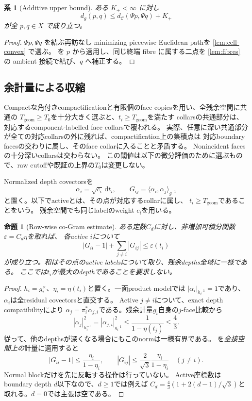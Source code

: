 \documentclass[11pt,a4paper]{ltjsarticle}
\newcommand{\dd}{\mathrm d}
\newcommand{\cC}{\mathcal C}
\theoremstyle{plain}
\newtheorem{proposition}[proposition]{命題}
\newtheorem{corollary}[corollary]{系}
\theoremstyle{definition}
\theoremstyle{remark}
\begin{document}
\begin{corollary}[Additive upper bound]
\label{cor:upper}
ある $K_+<\infty$ に対し
\[
 d_g(p,q)\le d_\cC(\Psi p,\Psi q)+K_+
\]
が全 $p,q\in X$ で成り立つ。
\end{corollary}
\begin{proof}
$\Psi p,\Psi q$ を結ぶ再訪なし minimizing piecewise Euclidean pathを \cref{lem:cell-convex} で選ぶ。 を $p$ から適用し、同じ終端 fibre に属する二点を \cref{lem:fibres} の ambient 接続で結び、$q$ へ補正する。
\end{proof}

\subsection{余計量による収縮}
Compactな角付きcompactificationと有限個のface copiesを用い、全残余空間に共通の
$T_{\mathrm{geom}}\ge T_0$を十分大きく選ぶと、$t_i\ge T_{\mathrm{geom}}$を満たす
collarsの共通部分は、対応するcomponent-labelled face collarsで覆われる。
実際、任意に深い共通部分が全ての対応collarsの外に残れば、compactification上の集積点は
対応boundary facesの交わりに属し、そのface collarに入ることと矛盾する。
Nonincident facesの十分深いcollarsは交わらない。
この閾値は以下の微分評価のために選ぶもので、raw cutoffや既証の上界の$T_0$は変更しない。

Normalized depth covectorsを
\[
 \alpha_i=\sqrt{c_i}\,\dd t_i,\qquad
 G_{ij}=\langle\alpha_i,\alpha_j\rangle_{g^{-1}}
\]
と置く。以下でactiveとは、その点が対応するcollarに属し、
$t_i\ge T_{\mathrm{geom}}$であることをいう。
残余空間でも同じlabelのweight $c_i$を用いる。

\begin{proposition}[Row-wise co-Gram estimate]
\label{prop:cogram}
ある定数$C_d$に対し、非増加可積分関数$\varepsilon=C_d\eta$を取れば、
各active $i$について
\[
 |G_{ii}-1|+\sum_{j\ne i}|G_{ij}|\le\varepsilon(t_i)
\]
が成り立つ。和はその点のactive labelsについて取り、残余depths全域に一様である。
ここでは$t_i$が最大のdepthであることを要求しない。
\end{proposition}
\begin{proof}
$h_i=g_i^\times$、$\eta_i=\eta(t_i)$と置く。一面product modelでは
$|\alpha_i|_{h_i^{-1}}=1$であり、$\alpha_i$は全residual covectorsと直交する。
Active $j\ne i$について、exact depth compatibilityにより
$\alpha_j=\pi_i^*\alpha_{j,i}$である。残余計量$g_i$自身の$j$-face比較から
\[
 |\alpha_j|_{h_i^{-1}}^2
 =|\alpha_{j,i}|_{g_i^{-1}}^2
 \le\frac{1}{1-\eta(t_j)}\le\frac43.
\]
従って、他のdepthsが深くなる場合にもこのnormは一様有界である。
を\emph{全接空間上の}計量に適用すると
\[
 |G_{ii}-1|\le\frac{\eta_i}{1-\eta_i},\qquad
 |G_{ij}|\le\frac{2}{\sqrt3}\frac{\eta_i}{1-\eta_i}\quad(j\ne i).
\]
Normal blockだけを先に反転する操作は行っていない。
Active座標数はboundary depth $d$以下なので、$d\ge1$では例えば
$C_d=\frac43(1+2(d-1)/\sqrt3)$と取れる。$d=0$では主張は空である。
\end{proof}
\end{document}
